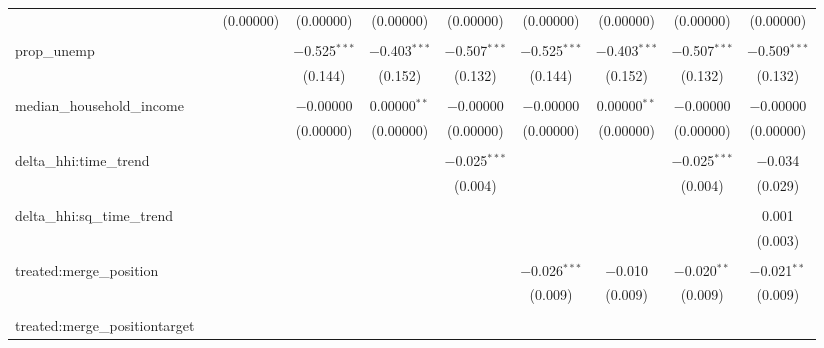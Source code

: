 \begin{table}[H]
{\begin{tabular}{@{\extracolsep{5pt}}lccccccccc}
   &  & (0.00000) & (0.00000) & (0.00000) & (0.00000) & (0.00000) & (0.00000) & (0.00000) & (0.00000) \\  

   & & & & & & & & & \\  

  prop\_unemp &  &  & $-$0.525$^{***}$ & $-$0.403$^{***}$ & $-$0.507$^{***}$ & $-$0.525$^{***}$ & $-$0.403$^{***}$ & $-$0.507$^{***}$ & $-$0.509$^{***}$ \\  

   &  &  & (0.144) & (0.152) & (0.132) & (0.144) & (0.152) & (0.132) & (0.132) \\  

   & & & & & & & & & \\  

  median\_household\_income &  &  & $-$0.00000 & 0.00000$^{**}$ & $-$0.00000 & $-$0.00000 & 0.00000$^{**}$ & $-$0.00000 & $-$0.00000 \\  

   &  &  & (0.00000) & (0.00000) & (0.00000) & (0.00000) & (0.00000) & (0.00000) & (0.00000) \\  

   & & & & & & & & & \\  

  delta\_hhi:time\_trend &  &  &  &  & $-$0.025$^{***}$ &  &  & $-$0.025$^{***}$ & $-$0.034 \\  

   &  &  &  &  & (0.004) &  &  & (0.004) & (0.029) \\  

   & & & & & & & & & \\  

  delta\_hhi:sq\_time\_trend &  &  &  &  &  &  &  &  & 0.001 \\  

   &  &  &  &  &  &  &  &  & (0.003) \\  

   & & & & & & & & & \\  

  treated:merge\_position &  &  &  &  &  & $-$0.026$^{***}$ & $-$0.010 & $-$0.020$^{**}$ & $-$0.021$^{**}$ \\  

   &  &  &  &  &  & (0.009) & (0.009) & (0.009) & (0.009) \\  

   & & & & & & & & & \\  

  treated:merge\_positiontarget &  &  &  &  &  &  &  &  &  \\  


\end{tabular}}
\end{table}
